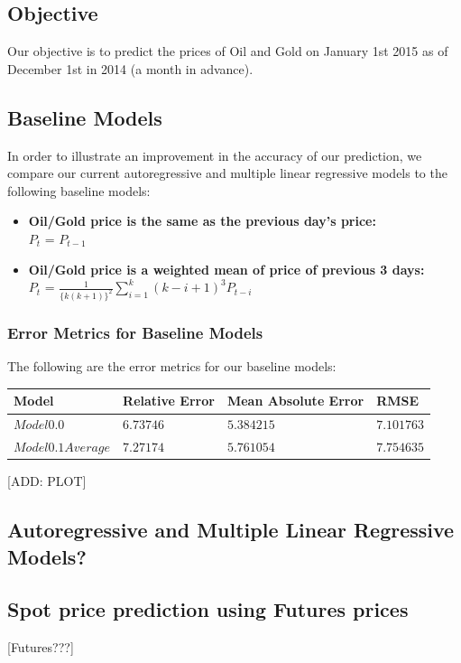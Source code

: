 \documentclass[runningheads]{llncs}
\begin{document}
\subsection{Objective}
Our objective is to predict the prices of Oil and Gold on January 1st 2015 as of December 1st in 2014 (a month in advance).

\subsection{Baseline Models}
In order to illustrate an improvement in the accuracy of our prediction, we compare our current autoregressive and multiple linear regressive models to the following baseline models:

\begin {itemize}
\item \textbf{Oil/Gold price is the same as the previous day's price:} \\
$P_{t}$ = $P_{t-1}$\\
\item \textbf{Oil/Gold price is a weighted mean of price of previous 3 days:} \\
$P_{t}$ = $\frac{1}{\{k(k+1)\}^2}\sum\limits_{i=1}^k (k-i+1)^3P_{t-i}$
\end {itemize}

\subsubsection {Error Metrics for Baseline Models} The following are the error metrics for our baseline models: \\

\begin{tabular}{|l|l|l|l|}
\hline
Model & Relative Error & Mean Absolute Error & RMSE \\ \hline
$ Model 0.0 $ & $6.73746$ & $5.384215$ & $7.101763$ \\ \hline
$ Model 0.1 Average $ & $7.27174$ & $5.761054$ & $7.754635$\\ \hline
\end{tabular}

[ADD: PLOT]

\subsection{Autoregressive and Multiple Linear Regressive Models?}

\subsection{Spot price prediction using Futures prices}
[Futures???]\\
\end{document}
